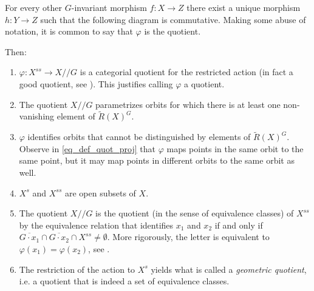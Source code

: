 {{\begin{minipage}{0.7 \textwidth}
    For every other $G$-invariant morphism $f\colon X \to Z$ there exist a unique morphism $h \colon Y \to Z$ such that the following diagram is commutative. Making some abuse of notation, it is common to say that $\varphi$ is the quotient. \label{def_categorical_quotient}
\end{minipage}
\begin{minipage}{0.25\textwidth}
    \begin{center}
    \end{center}
\end{minipage} }

Then:
\begin{enumerate}
    \item \(\varphi\colon X^{ss} \to X /\!\!/G\) is a categorial quotient for the restricted action (in fact a good quotient, see \parencite[Prop. 4.8]{hoskins}). This justifies calling \(\varphi\) a quotient.
    \item The quotient \(X /\!\!/G\) parametrizes orbits for which there is at least one non-vanishing element of \(\tilde{R}(X)^G\).
    \item \(\varphi\) identifies orbits that cannot be distinguished by elements of \(\tilde{R}(X)^G\). Observe in \eqref{eq_def_quot_proj} that \(\varphi\) maps points in the same orbit to the same point, but it may map points in different orbits to the same orbit as well.
    \item \(X^s\) and \(X^{ss}\) are open subsets of \(X\).
    \item The quotient \(X /\!\!/G\) is the quotient (in the sense of equivalence classes) of \(X^{ss}\) by the equivalence relation that identifies \(x_1\) and \(x_2\) if and only if \(\overline{G \cdot x_1}\cap \overline{G\cdot x_2} \cap X^{ss}\neq \emptyset\). More rigorously, the letter is equivalent to \(\varphi(x_1)=\varphi(x_2)\), see \parencite[Th. 4.11]{hoskins}.
    \item The restriction of the action to \(X^s\) yields what is called a \textit{geometric quotient}, i.e. a quotient that is indeed a set of equivalence classes.
\end{enumerate}

}
